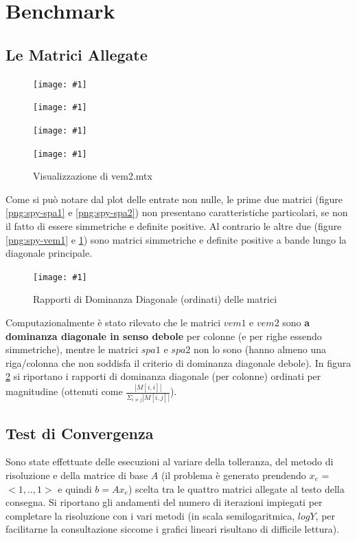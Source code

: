 \documentclass[a4paper,11pt,oneside, table]{article}
\newcommand{\putimage}[4] {
	\begin{figure}[H]
	    \centering
	    \texttt{[image: \#1]}
	    \caption{#2}\label{#3}
	\end{figure}
}
\newcommand{\putsubimage}[5] {
  \begin{minipage}{{#4}\linewidth}
	    \centering
      \texttt{[image: \#1]}
	    \caption{#2}\label{#3}
	\end{minipage}
}
\newcommand{\putimagequadruple}[4] {
  \begin{figure}[!htb]
      \centering
      #1
      \hspace{0.5cm}
      #2
      \linebreak
      #3
      \hspace{0.5cm}
      #4
  \end{figure}
}
\begin{document}
\section{Benchmark}

\subsection{Le Matrici Allegate}

\putimagequadruple
  {\putsubimage{./images/spy-spa1.png}{Visualizzazione di spa1.mtx}{png:spy-spa1}{0.4}{0.8}}
  {\putsubimage{./images/spy-spa2.png}{Visualizzazione di spa2.mtx}{png:spy-spa2}{0.4}{0.8}}
  {\putsubimage{./images/spy-vem1.png}{Visualizzazione di vem1.mtx}{png:spy-vem1}{0.4}{0.8}}
  {\putsubimage{./images/spy-vem2.png}{Visualizzazione di vem2.mtx}{png:spy-vem2}{0.4}{0.8}}

Come si pu\`o notare dal plot delle entrate non nulle, le prime due matrici (figure \ref{png:spy-spa1} e \ref{png:spy-spa2}) non presentano caratteristiche particolari, se non il fatto di essere simmetriche e definite positive.
Al contrario le altre due (figure \ref{png:spy-vem1} e \ref{png:spy-vem2}) sono matrici simmetriche e definite positive a bande lungo la diagonale principale.

\putimage{./images/dominance.png}{Rapporti di Dominanza Diagonale (ordinati) delle matrici}{png:dominance}{0.99}

Computazionalmente \`e stato rilevato che le matrici $vem1$ e $vem2$ sono \textbf{a dominanza diagonale in senso debole} per colonne (e per righe essendo simmetriche), mentre le matrici $spa1$ e $spa2$ non lo sono (hanno almeno una riga/colonna che non soddisfa il criterio di dominanza diagonale debole).
In figura \ref{png:dominance} si riportano i rapporti di dominanza diagonale (per colonne) ordinati per magnitudine (ottenuti come $\frac {| M[i, i] |} {\Sigma _ {i \ne j} | M[i, j] |}$).

\subsection{Test di Convergenza}

Sono state effettuate delle esecuzioni al variare della tolleranza, del metodo di risoluzione e della matrice di base $A$ (il problema \`e generato prendendo $x_e$ = $<1,.., 1>$ e quindi $b = Ax_e$) scelta tra le quattro matrici allegate al testo della consegna.
Si riportano gli andamenti del numero di iterazioni impiegati per completare la risoluzione con i vari metodi (in scala semilogaritmica, $logY$, per facilitarne la consultazione siccome i grafici lineari risultano di difficile lettura).
\end{document}

